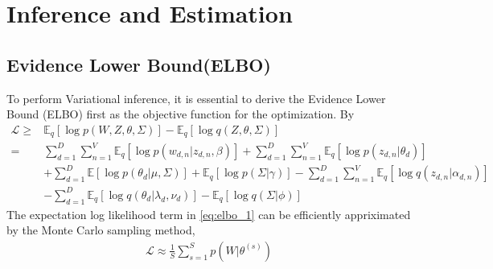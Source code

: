 \section{Inference and Estimation}
\subsection{Evidence Lower Bound(ELBO)}\label{ch4:2} To perform Variational inference, it is essential to derive the Evidence Lower Bound (ELBO) first as the objective function for the optimization. By 
\begin{align}\label{eq:elbo_1}
\mathcal{L}\geq&\mathbb{E}_q[\log p(W,Z,\theta,\Sigma)]-\mathbb{E}_q[\log q(Z,\theta,\Sigma)]\\
=&\sum_{d=1}^{D}\sum_{n=1}^{V}\mathbb{E}_q[\log p(w_{d,n}|z_{d,n},\beta)]+\sum_{d=1}^{D}\sum_{n=1}^{V}\mathbb{E}_q[\log p(z_{d,n}|\theta_d)]\\
&+\sum_{d=1}^{D}\mathbb{E}[\log p(\theta_d|\mu,\Sigma)]+\mathbb{E}_q[\log p(\Sigma|\gamma)]-\sum_{d=1}^{D}\sum_{n=1}^{V}\mathbb{E}_q[\log q(z_{d,n}|\alpha_{d,n})]\\
&-\sum_{d=1}^{D}\mathbb{E}_q[\log q(\theta_d|\lambda_d,\nu_d)]-\mathbb{E}_q[\log q(\Sigma|\phi)]
\end{align}
The expectation log likelihood term in \ref{eq:elbo_1} can be efficiently appriximated by the Monte Carlo sampling method,
\begin{align}\label{eq:elbo_2}
\mathcal{L}\approx\frac{1}{S}\sum_{s=1}^{S}p(W|\theta^{(s)})
\end{align}
